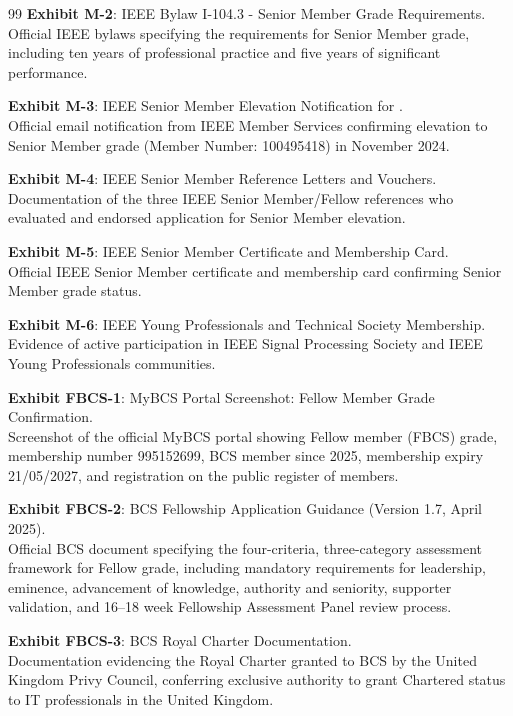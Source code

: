 \documentclass[11pt]{article}
\begin{document}
\begin{thebibliography}{99}
\textbf{Exhibit M-2}: IEEE Bylaw I-104.3 - Senior Member Grade Requirements.
\\Official IEEE bylaws specifying the requirements for Senior Member grade, including ten years of professional practice and five years of significant performance.

\textbf{Exhibit M-3}: IEEE Senior Member Elevation Notification for \dr.
\\Official email notification from IEEE Member Services confirming \drs elevation to Senior Member grade (Member Number: 100495418) in November 2024.

\textbf{Exhibit M-4}: IEEE Senior Member Reference Letters and Vouchers.
\\Documentation of the three IEEE Senior Member/Fellow references who evaluated and endorsed \drs application for Senior Member elevation.

\textbf{Exhibit M-5}: IEEE Senior Member Certificate and Membership Card.
\\Official IEEE Senior Member certificate and membership card confirming \drs Senior Member grade status.

\textbf{Exhibit M-6}: IEEE Young Professionals and Technical Society Membership.
\\Evidence of \drs active participation in IEEE Signal Processing Society and IEEE Young Professionals communities.

\textbf{Exhibit FBCS-1}: MyBCS Portal Screenshot: Fellow Member Grade Confirmation.
\\Screenshot of the official MyBCS portal showing \drs Fellow member (FBCS) grade, membership number 995152699, BCS member since 2025, membership expiry 21/05/2027, and registration on the public register of members.

\textbf{Exhibit FBCS-2}: BCS Fellowship Application Guidance (Version 1.7, April 2025).
\\Official BCS document specifying the four-criteria, three-category assessment framework for Fellow grade, including mandatory requirements for leadership, eminence, advancement of knowledge, authority and seniority, supporter validation, and 16--18 week Fellowship Assessment Panel review process.

\textbf{Exhibit FBCS-3}: BCS Royal Charter Documentation.
\\Documentation evidencing the Royal Charter granted to BCS by the United Kingdom Privy Council, conferring exclusive authority to grant Chartered status to IT professionals in the United Kingdom.


\end{thebibliography}
\end{document}
